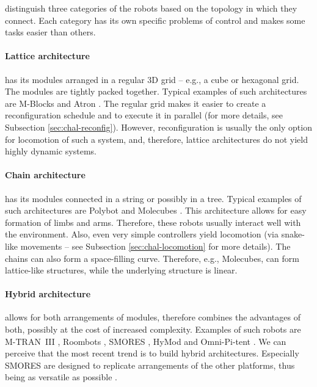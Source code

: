 \textcite{4141032} distinguish three categories of the robots based on the
topology in which they connect. Each category has its own specific problems of
control and makes some tasks easier than others.

\paragraph{Lattice architecture} has its modules arranged in a regular 3D grid
-- e.g., a cube or hexagonal grid. The modules are tightly packed together.
Typical examples of such architectures are M-Blocks
\cite{DBLP:conf/iros/RomanishinGR13} and Atron
\cite{DBLP:conf/iros/JorgensenOL04}. The regular grid makes it easier to create
a reconfiguration schedule and to execute it in parallel (for more details, see
Subsection \ref{sec:chal-reconfig}). However, reconfiguration is usually the
only option for locomotion of such a system, and, therefore, lattice
architectures do not yield highly dynamic systems.

\paragraph{Chain architecture} has its modules connected in a string or possibly
in a tree. Typical examples of such architectures are Polybot
\cite{DBLP:conf/icra/YimDR00} and Molecubes
\cite{DBLP:journals/trob/ZykovMDL07}. This architecture allows for easy
formation of limbs and arms. Therefore, these robots usually interact well with
the environment. Also, even very simple controllers yield locomotion (via
snake-like movements -- see Subsection \ref{sec:chal-locomotion} for more
details). The chains can also form a space-filling curve. Therefore, e.g.,
Molecubes, can form lattice-like structures, while the underlying structure is
linear.

\paragraph{Hybrid architecture} allows for both arrangements of modules,
therefore combines the advantages of both, possibly at the cost of increased
complexity. Examples of such robots are M-TRAN~III
\cite{DBLP:journals/ijrr/KurokawaTKKHM08}, Roombots
\cite{DBLP:conf/icra/SprowitzBDI09}, SMORES \cite{DBLP:conf/iros/DaveyKY12},
HyMod \cite{DBLP:conf/dars/ParrottDG16} and Omni-Pi-tent
\cite{DBLP:conf/taros/PeckTT19}. We can perceive that the most recent trend is
to build hybrid architectures. Especially SMORES are designed to replicate
arrangements of the other platforms, thus being as versatile as possible
\cite{DBLP:conf/iros/DaveyKY12}.

